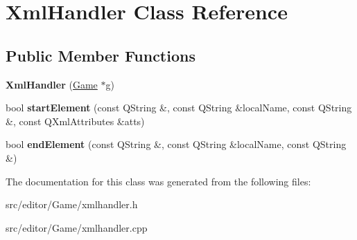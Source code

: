 \hypertarget{class_xml_handler}{\section{\-Xml\-Handler \-Class \-Reference}
\label{class_xml_handler}
}
\subsection*{\-Public \-Member \-Functions}
\begin{DoxyCompactItemize}
\item 
\hypertarget{class_xml_handler_a98cf939ef528aa336c7e4b2ae7f1a431}{{\bfseries \-Xml\-Handler} (\hyperlink{class_game}{\-Game} $\ast$g)}\label{class_xml_handler_a98cf939ef528aa336c7e4b2ae7f1a431}

\item 
\hypertarget{class_xml_handler_a23b06b0d562fa3be82b42f46148a4175}{bool {\bfseries start\-Element} (const \-Q\-String \&, const \-Q\-String \&local\-Name, const \-Q\-String \&, const \-Q\-Xml\-Attributes \&atts)}\label{class_xml_handler_a23b06b0d562fa3be82b42f46148a4175}

\item 
\hypertarget{class_xml_handler_a647d0b062e0d8c8d4b65bfe040dee441}{bool {\bfseries end\-Element} (const \-Q\-String \&, const \-Q\-String \&local\-Name, const \-Q\-String \&)}\label{class_xml_handler_a647d0b062e0d8c8d4b65bfe040dee441}

\end{DoxyCompactItemize}


\-The documentation for this class was generated from the following files\-:\begin{DoxyCompactItemize}
\item 
src/editor/\-Game/xmlhandler.\-h\item 
src/editor/\-Game/xmlhandler.\-cpp\end{DoxyCompactItemize}
